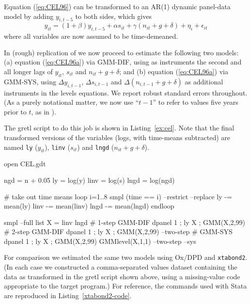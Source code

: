 Equation (\ref{eq:CEL96}) can be transformed to an AR(1) dynamic
panel-data model by adding $y_{i,t-5}$ to both sides, which gives
\begin{equation}
\label{eq:CEL96a}
y_{it} = (1 + \beta) y_{i,t-5} + \alpha s_{it} + \gamma (n_{it} +
g + \delta) + \eta_i + \epsilon_{it}
\end{equation}
where all variables are now assumed to be time-demeaned.

In (rough) replication of \cite{Bond2001} we now proceed to estimate
the following two models: (a) equation (\ref{eq:CEL96a}) via GMM-DIF,
using as instruments the second and all longer lags of $y_{it}$,
$s_{it}$ and $n_{it} + g + \delta$; and (b) equation
(\ref{eq:CEL96a}) via GMM-SYS, using $\Delta y_{i,t-1}$, $\Delta
s_{i,t-1}$ and $\Delta (n_{i,t-1} + g + \delta)$ as additional
instruments in the levels equations. We report robust standard errors
throughout. (As a purely notational matter, we now use ``$t-1$'' to
refer to values five years prior to $t$, as in \cite{Bond2001}).

The gretl script to do this job is shown in
Listing~\ref{ex:cel}. Note that the final transformed versions of
the variables (logs, with time-means subtracted) are named \texttt{ly}
($y_{it}$), \texttt{linv} ($s_{it}$) and \texttt{lngd}
($n_{it} + g + \delta$).

\begin{script}[htbp]
\begin{scode}
open CEL.gdt

ngd = n + 0.05
ly = log(y)
linv = log(s)
lngd = log(ngd)

# take out time means
loop i=1..8
  smpl (time == i) --restrict --replace
  ly -= mean(ly)
  linv -= mean(linv)
  lngd -= mean(lngd)
endloop

smpl --full
list X = linv lngd
# 1-step GMM-DIF
dpanel 1 ; ly X ; GMM(X,2,99)
# 2-step GMM-DIF
dpanel 1 ; ly X ; GMM(X,2,99) --two-step
# GMM-SYS
dpanel 1 ; ly X ; GMM(X,2,99) GMMlevel(X,1,1) --two-step --sys
\end{scode}
\end{script}

For comparison we estimated the same two models using Ox/DPD and
\texttt{xtabond2}. (In each case we constructed a comma-separated
values dataset containing the data as transformed in the gretl script
shown above, using a missing-value code appropriate to the target
program.) For reference, the commands used with Stata are reproduced
in Listing~\ref{xtabond2-code}.

